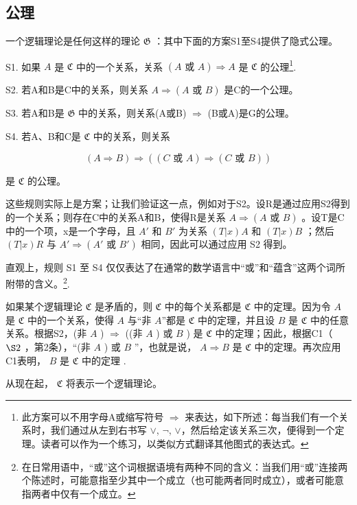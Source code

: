 \subsection{公理}

一个逻辑理论是任何这样的理论 \(\mathfrak{G}\) ：其中下面的方案S1至S4提供了隐式公理。

S1. 如果 \(A\) 是 \(\mathfrak{C}\) 中的一个关系，关系 \((A \text{ 或 } A) \Longrightarrow A\) 是 \(\mathfrak{C}\) 的公理\footnote{此方案可以不用字母A或缩写符号 \(\Longrightarrow\) 来表达，如下所述：每当我们有一个关系时，我们通过从左到右书写 \(\vee\), \(\neg\), \(\vee\)，然后给定该关系三次，便得到一个定理。读者可以作为一个练习，以类似方式翻译其他图式的表达式。}.

S2. 若A和B是C中的关系，则关系 \(A \Longrightarrow (A \text{ 或 } B)\) 是C的一个公理。

S3. 若A和B是 \(\mathfrak{G}\) 中的关系，则关系(A或B) \(\Longrightarrow\) (B或A)是G的公理。

S4. 若A、B和C是 \(\mathfrak{C}\) 中的关系，则关系

\[
(A \Rightarrow B) \Rightarrow ((C \text {   或   } A) \Rightarrow (C \text {   或   } B))
\]

是 \(\mathfrak{C}\) 的公理。

这些规则实际上是方案；让我们验证这一点，例如对于S2。设R是通过应用S2得到的一个关系；则存在C中的关系A和B，使得R是关系 \(A \Longrightarrow (A \text{ 或 } B)\) 。设T是C中的一个项，x是一个字母，且 \(A'\) 和 \(B'\) 为关系 \((T|x)A\) 和 \((T|x)B\) ；然后 \((T|x)R\) 与 \(A' \Longrightarrow (A' \text{ 或 } B')\) 相同，因此可以通过应用 S2 得到。

直观上，规则 S1 至 S4 仅仅表达了在通常的数学语言中“或”和“蕴含”这两个词所附带的含义。\footnote{在日常用语中，“或”这个词根据语境有两种不同的含义：当我们用“或”连接两个陈述时，可能意指至少其中一个成立（也可能两者同时成立），或者可能意指两者中仅有一个成立。}.

如果某个逻辑理论 \(\mathfrak{C}\) 是矛盾的，则 \(\mathfrak{C}\) 中的每个关系都是 \(\mathfrak{C}\) 中的定理。因为令 \(A\) 是 \(\mathfrak{C}\) 中的一个关系，使得 \(A\) 与“非 \(A\)”都是 \(\mathfrak{C}\) 中的定理，并且设 \(B\) 是 \(\mathfrak{C}\) 中的任意关系。根据S2，(非 \(A\) ) \(\Longrightarrow\) ((非 \(A\) ) 或 \(B\) ) 是 \(\mathfrak{C}\) 中的定理；因此，根据C1（ \(\S 2\) ，第2条），“(非 \(A\) ) 或 \(B\) ”，也就是说， \(A\Longrightarrow B\) 是 \(\mathfrak{C}\) 中的定理。再次应用C1表明， \(B\) 是 \(\mathfrak{C}\) 中的定理 .

从现在起， \(\mathfrak{C}\) 将表示一个逻辑理论。

